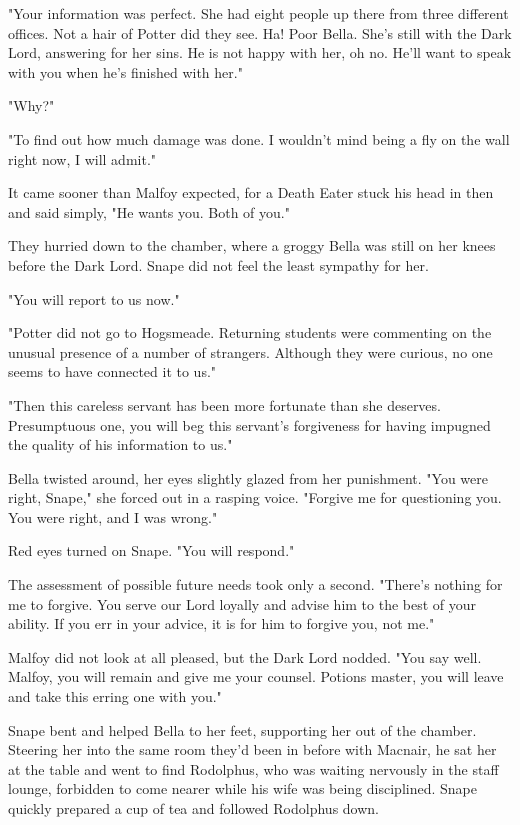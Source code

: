 \documentclass[a4paper,11pt]{article}
\begin{document}
"Your information was perfect. She had eight people up there from three different offices. Not a hair of Potter did they see. Ha! Poor Bella. She's still with the Dark Lord, answering for her sins. He is not happy with her, oh no. He'll want to speak with you when he's finished with her."

"Why?"

"To find out how much damage was done. I wouldn't mind being a fly on the wall right now, I will admit."

It came sooner than Malfoy expected, for a Death Eater stuck his head in then and said simply, "He wants you. Both of you."

They hurried down to the chamber, where a groggy Bella was still on her knees before the Dark Lord. Snape did not feel the least sympathy for her.

"You will report to us now."

"Potter did not go to Hogsmeade. Returning students were commenting on the unusual presence of a number of strangers. Although they were curious, no one seems to have connected it to us."

"Then this careless servant has been more fortunate than she deserves. Presumptuous one, you will beg this servant's forgiveness for having impugned the quality of his information to us."

Bella twisted around, her eyes slightly glazed from her punishment. "You were right, Snape," she forced out in a rasping voice. "Forgive me for questioning you. You were right, and I was wrong."

Red eyes turned on Snape. "You will respond."

The assessment of possible future needs took only a second. "There's nothing for me to forgive. You serve our Lord loyally and advise him to the best of your ability. If you err in your advice, it is for him to forgive you, not me."

Malfoy did not look at all pleased, but the Dark Lord nodded. "You say well. Malfoy, you will remain and give me your counsel. Potions master, you will leave and take this erring one with you."

Snape bent and helped Bella to her feet, supporting her out of the chamber. Steering her into the same room they'd been in before with Macnair, he sat her at the table and went to find Rodolphus, who was waiting nervously in the staff lounge, forbidden to come nearer while his wife was being disciplined. Snape quickly prepared a cup of tea and followed Rodolphus down.
\end{document}
